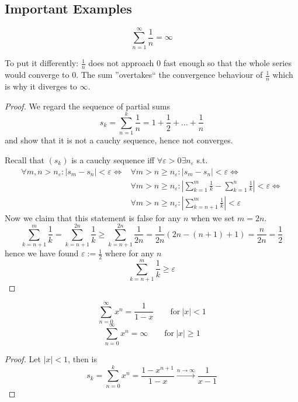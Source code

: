 \subsection{Important Examples}
\begin{proposition}
   \[\sum_{n = 1}^\infty \frac{1}{n} = \infty\]
\end{proposition}
\begin{remark}
   To put it differently: \(\frac{1}{n}\) does not approach 0 fast enough so that the whole series would converge to 0.
   The sum ''overtakes`` the convergence behaviour of \(\frac{1}{n}\) which is why it diverges to \(\infty\).
\end{remark}
\begin{proof}
   We regard the sequence of partial sums
   \[s_k = \sum_{n = 1}^k \frac{1}{n} = 1 + \frac{1}{2} + \ldots + \frac{1}{n}\]
   and show that it is not a cauchy sequence, hence not converges.

   Recall that \((s_k)\) is a cauchy sequence iff \(\forall \varepsilon > 0 \exists n_\varepsilon\) s.t.
   \begin{equation*}
      \begin{split}
         \forall m, n > n_\varepsilon: |s_m - s_n| < \varepsilon \iff & \forall m > n \geq n_\varepsilon: |s_m - s_n| < \varepsilon \iff \\
                                                                      & \forall m > n \geq n_\varepsilon: \left|\sum_{k=1}^m \frac{1}{k} - \sum_{k = 1}^n \frac{1}{k}\right| < \varepsilon \iff \\
                                                                      & \forall m > n \geq n_\varepsilon: \left|\sum_{k=n+1}^m \frac{1}{k}\right| < \varepsilon
      \end{split}
   \end{equation*}
   Now we claim that this statement is false for any \(n\) when we set \(m = 2n\).
   \[\sum_{k=n+1}^{m} \frac{1}{k} = \sum_{k=n+1}^{2n} \frac{1}{k} \geq \sum_{k=n+1}^{2n} \frac{1}{2n} = \frac{1}{2n} (2n - (n+1) + 1) = \frac{n}{2n} = \frac{1}{2}\]
   hence we have found \(\varepsilon := \frac{1}{2}\) where for any \(n\)
   \[\sum_{k=n+1}^{m} \frac{1}{k} \geq \varepsilon\]
\end{proof}

\begin{proposition}
   \[\sum_{n = 0}^\infty x^n = \frac{1}{1 - x} \qquad\text{for}~|x| < 1\]
   \[\sum_{n = 0}^\infty x^n = \infty \qquad\text{for}~|x| \geq 1\]
\end{proposition}
\begin{proof}
   Let \(|x| < 1 \), then is
   \[s_k = \sum_{n = 0}^k x^n = \frac{1 - x^{n+1}}{1 - x} \xrightarrow{n \to \infty} \frac{1}{x-1}\]
\end{proof}


